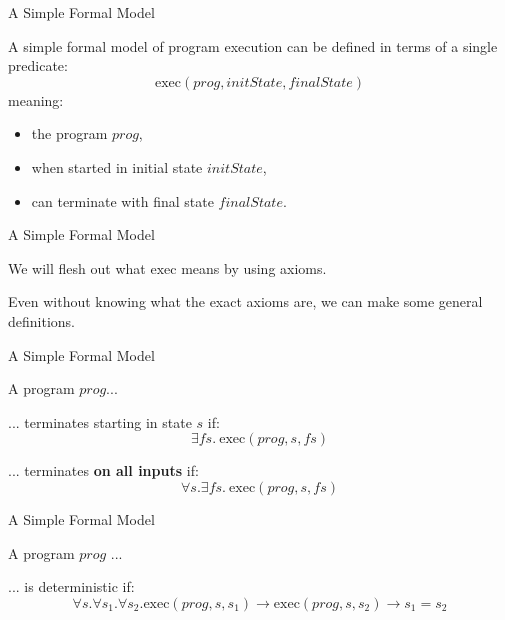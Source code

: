 \documentclass[xetex,aspectratio=169,14pt,hyperref={pdfpagelabels=true,pdflang={en-GB}}]{beamer}
\begin{document}
\begin{frame}
  {A Simple Formal Model}

  A simple formal model of program execution can be defined in terms
  of a single predicate:
  \begin{displaymath}
    \mathrm{exec}(\mathit{prog}, \mathit{initState}, \mathit{finalState})
  \end{displaymath}
  meaning:
  \begin{itemize}
  \item the program $\mathit{prog}$,
  \item when started in initial state $\mathit{initState}$,
  \item can terminate with final state $\mathit{finalState}$.
  \end{itemize}
\end{frame}

\begin{frame}
  {A Simple Formal Model}

  We will flesh out what $\mathrm{exec}$ means by using axioms.

  \bigskip

  Even without knowing what the exact axioms are, we can make some
  general definitions.
\end{frame}

\begin{frame}
  {A Simple Formal Model}

  A program $\mathit{prog}$...

  \bigskip

  ... terminates starting in state $\mathit{s}$ if:
  \begin{displaymath}
    \exists \mathit{fs}.~\mathrm{exec}(\mathit{prog}, \mathit{s}, \mathit{fs})
  \end{displaymath}

  \bigskip

  ... terminates {\bf on all inputs} if:
  \begin{displaymath}
    \forall \mathit{s}. \exists \mathit{fs}.~\mathrm{exec}(\mathit{prog}, \mathit{s}, \mathit{fs})
  \end{displaymath}

\end{frame}

\begin{frame}
  {A Simple Formal Model}

  A program $\mathit{prog}$ ...

  \bigskip

  ... is deterministic if:
  \begin{displaymath}
    \forall s. \forall s_1. \forall s_2. \mathrm{exec}(\mathit{prog}, s, s_1) \to \mathrm{exec}(\mathit{prog}, s, s_2) \to s_1 = s_2
  \end{displaymath}

\end{frame}
\end{document}
